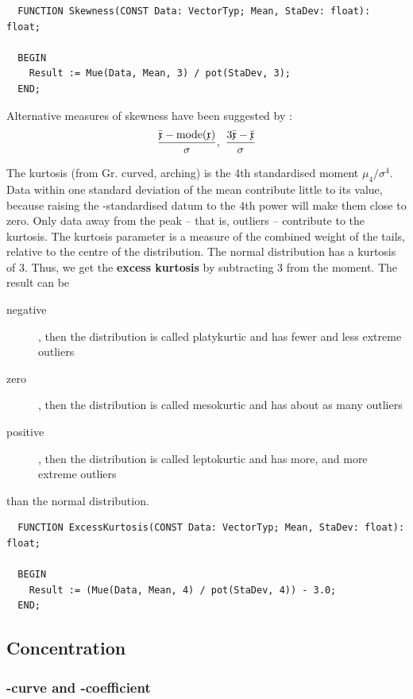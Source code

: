 \begin{refsection}
\begin{lstlisting}
  FUNCTION Skewness(CONST Data: VectorTyp; Mean, StaDev: float): float;

  BEGIN
    Result := Mue(Data, Mean, 3) / pot(StaDev, 3);
  END;
\end{lstlisting}

Alternative measures of skewness have been suggested by :
\begin{equation}
  \frac{\bar{\mathfrak{x}} - \mathrm{mode}(\mathfrak{x})}{\sigma},\ \frac{3 \bar{\mathfrak{x}} - \breve{\mathfrak{x}}}{\sigma}
\end{equation}

The kurtosis (from Gr. curved, arching) is the 4th standardised  moment \( \mu_4/\sigma^4\). Data within one standard deviation of the mean contribute little to its value, because raising the -standardised datum to the 4th power will make them close to zero. Only data away from the peak -- that is, outliers -- contribute to the kurtosis. The kurtosis parameter is a measure of the combined weight of the tails, relative to the centre of the distribution. The normal distribution has a kurtosis of \num{3}. Thus, we get the \textbf{excess kurtosis} by subtracting \num{3} from the moment. The result can be
\begin{description}
  \item[negative]{, then the distribution is called platykurtic and has fewer and less extreme outliers }
  \item[zero]{, then the distribution is called mesokurtic and has about as many outliers}
  \item[positive]{, then the distribution is called leptokurtic and has more, and more extreme outliers}
\end{description}
than the normal distribution.

\begin{lstlisting}
  FUNCTION ExcessKurtosis(CONST Data: VectorTyp; Mean, StaDev: float): float;

  BEGIN
    Result := (Mue(Data, Mean, 4) / pot(StaDev, 4)) - 3.0;
  END;
\end{lstlisting}

\subsection{Concentration}

\subsubsection{-curve and -coefficient}


\end{refsection}
